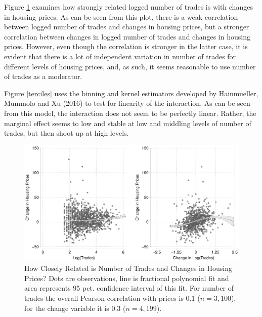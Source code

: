 \documentclass[12pt,a4paper]{article}
\begin{document}
			Figure \ref{scatter} examines how strongly related logged number of trades is with changes in housing prices. As can be seen from this plot, there is a weak correlation between logged number of trades and changes in housing prices, but a stronger correlation between changes in logged number of trades and changes in housing prices. However, even though the correlation is stronger in the latter case, it is evident that there is a lot of independent variation in number of trades for different levels of housing prices, and, as such, it seems reasonable to use number of trades as a moderator.
			
			Figure \ref{terciles} uses the binning and kernel estimators developed by Hainmueller, Mummolo and Xu (2016) to test for linearity of the interaction. As can be seen from this model, the interaction does not seem to be perfectly linear. Rather, the marginal effect seems to low and stable at low and middling levels of number of trades, but then shoot up at high levels.
			
			\begin{figure}
				\includegraphics[width=1\textwidth]{../figures/corrmoderator.eps}
				\caption{How Closely Related is Number of Trades and Changes in Housing Prices? Dots are observations, line is fractional polynomial fit and area represents 95 pct. confidence interval of this fit. For number of trades the overall Pearson correlation with prices is $0.1$ ($n=3,100$), for the change variable it is $0.3$ ($n=4,199$). }
				\label{scatter}
			\end{figure}
			
\end{document}
